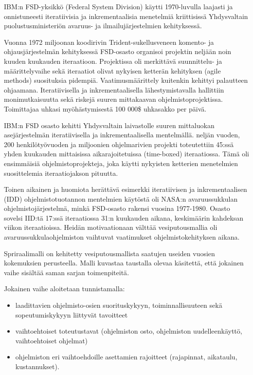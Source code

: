 \documentclass[finnish]{tktltiki2}
\theoremstyle{definition}
\theoremstyle{remark}
\begin{document}
IBM:n FSD-yksikkö (Federal System Division) käytti 1970-luvulla laajasti ja onnistuneesti iteratiivisia ja inkrementaalisia menetelmiä kriittisissä Yhdysvaltain puolustusministeriön avaruus- ja ilmailujärjestelmien kehityksessä\cite{LAB03}.

Vuonna 1972 miljoonan koodirivin Trident-sukellusveneen komento- ja ohjausjärjestelmän kehityksessä FSD-osasto organisoi projektin neljään noin kuuden kuukauden iteraatioon. Projektissa oli merkittävä suunnittelu- ja määrittelyvaihe sekä iteraatiot olivat nykyisen ketterän kehityksen (agile methods) suosituksia pidempiä. Vaatimus\-määrittely kuitenkin kehittyi palautteen ohjaamana. Iteratiivisella ja inkrementaalisella lähestymistavalla hallittiin monimutkaisuutta sekä riskejä suuren mittakaavan ohjelmistoprojektissa. Toimittajaa uhkasi myöhästymisestä 100 000\$ uhkasakko per päivä\cite{LAB03}.

IBM:n FSD osasto kehitti Yhdysvaltain laivastolle suuren mittaluokan asejärjestelmän iteratiivisella ja inkrementaalisella mentelmällä. neljän vuoden, 200 henkilötyövuoden ja miljoonien ohjelmarivien projekti toteutettiin 45:ssä yhden kuukauden mittaisissa aikarajoitetuissa (time-boxed) iteraatiossa. Tämä oli ensimmäisiä ohjelmistoprojekteja, joka käytti nykyisten ketterien menetelmien suosittelemia iteraatiojakson pituutta\cite{LAB03}.

Toinen aikainen ja huomiota herättävä esimerkki iteratiivisen ja inkrementaalisen (IDD) ohjelmistotuotannon mentelmien käytöstä oli NASA:n avaruussukkulan ohjelmistojärjestelmä, minkä FSD-osasto rakensi vuosina 1977-1980. Osasto sovelsi IID:tä 17:ssä iteraatiossa 31:n kuukauden aikana, keskimäärin kahdeksan viikon iteraatioissa. Heidän motivaationaan välttää vesiputousmallia oli avaruussukkulaohjelmiston vaihtuvat vaatimukset ohjelmistokehityksen aikana\cite{LAB03}.

Spriraalimalli on kehitetty vesiputousmallista saatujen  useiden vuosien kokemuksien perusteella. Malli kuvastaa taustalla olevaa käsitettä, että jokainen vaihe sisältää saman sarjan toimenpiteitä\cite{BOE88}.

Jokainen vaihe aloitetaan tunnistamalla:
\begin{itemize}
  \item laadittavien ohjelmisto-osien suorituskykyyn, toiminnallisuuteen sekä sopeutumiskykyyn liittyvät tavoitteet
  \item vaihtoehtoiset toteutustavat (ohjelmiston osto, ohjelmiston uudelleenkäyttö, vaihtoehtoiset ohjelmat)
  \item ohjelmiston eri vaihtoehdoille asettamien rajoitteet (rajapinnat, aikataulu, kustannukset)\cite{BOE88}.
\end{itemize}
\end{document}
